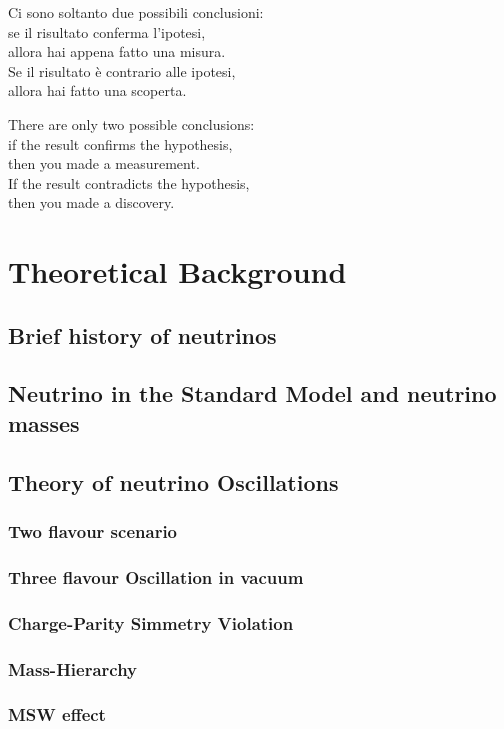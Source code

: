 \begin{savequote}[8cm]
Ci sono soltanto due possibili conclusioni: \\
se il risultato conferma l'ipotesi,\\
allora hai appena fatto una misura. \\
Se il risultato è contrario alle ipotesi, \\
allora hai fatto una scoperta.

There are only two possible conclusions:\\
if the result confirms the hypothesis, \\
then you made a measurement.\\
If the result contradicts the hypothesis, \\
then you made a discovery.
\end{savequote}

\chapter{\label{ch:2-litreview}Theoretical Background}
\minitoc
\section{Brief history of neutrinos}
\section{Neutrino in the Standard Model and neutrino masses}
\section{Theory of neutrino Oscillations}
\subsection{Two flavour scenario}
\subsection{Three flavour Oscillation in vacuum}
\subsection{Charge-Parity Simmetry Violation}
\subsection{Mass-Hierarchy}
\subsection{MSW effect}
